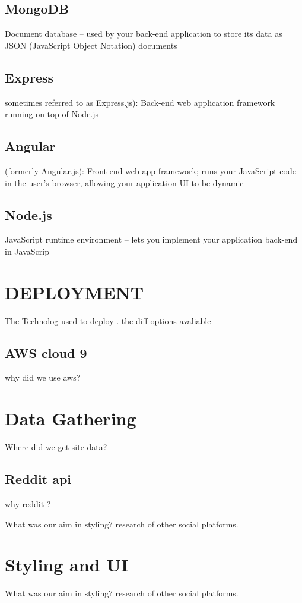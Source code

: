 \subsection{MongoDB}
Document database – used by your back-end application to store its data as JSON (JavaScript Object Notation) documents

\subsection{Express}
sometimes referred to as Express.js): Back-end web application framework running on top of Node.js

\subsection{Angular}
(formerly Angular.js): Front-end web app framework; runs your JavaScript code in the user’s browser, allowing your application UI to be dynamic

\subsection{Node.js}
JavaScript runtime environment – lets you implement your application back-end in JavaScrip
\section{DEPLOYMENT}
The Technolog used to deploy . the diff options avaliable 
\subsection{AWS cloud 9}
why did we use aws?


\section{Data Gathering}
Where did we get site data?
\subsection{Reddit api}
why reddit ?

What was our aim in styling? research of other social platforms.

\section{Styling and UI}
What was our aim in styling? research of other social platforms.

